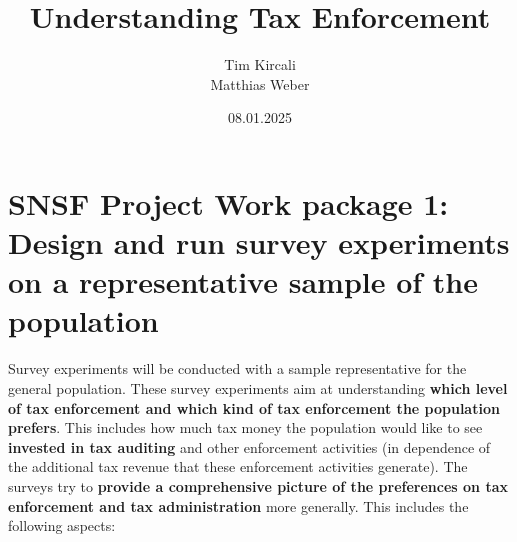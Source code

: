 \documentclass[a4paper, 12pt]{article}
\title{\normalsize \textbf{Understanding Tax Enforcement}}
\author{\small Tim Kircali\\
\small Matthias Weber}
\date{\small 08.01.2025}
\begin{document}
\maketitle
\onehalfspacing
\tableofcontents
\section{SNSF Project Work package 1: Design and run survey experiments on a representative sample of the population}
Survey experiments will be conducted with a sample representative for the general population. These survey experiments  aim at understanding \textbf{which level of tax enforcement and which kind of tax enforcement the population prefers}. This  includes how much tax money the population would like to see\textbf{ invested in tax auditing} and other enforcement activities  (in dependence of the additional tax revenue that these enforcement activities generate). The surveys try to\textbf{ provide a comprehensive picture of the preferences on tax enforcement and tax administration} more generally. This includes the following aspects:
\end{document}
